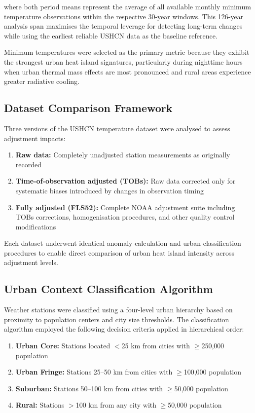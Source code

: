 \documentclass[11pt, a4paper]{article}
\begin{document}
where both period means represent the average of all available monthly minimum temperature observations within the respective 30-year windows. This 126-year analysis span maximises the temporal leverage for detecting long-term changes while using the earliest reliable USHCN data as the baseline reference.

Minimum temperatures were selected as the primary metric because they exhibit the strongest urban heat island signatures, particularly during nighttime hours when urban thermal mass effects are most pronounced and rural areas experience greater radiative cooling.

\subsection{Dataset Comparison Framework}

Three versions of the USHCN temperature dataset were analysed to assess adjustment impacts:

\begin{enumerate} \item \textbf{Raw data:} Completely unadjusted station measurements as originally recorded \item \textbf{Time-of-observation adjusted (TOBs):} Raw data corrected only for systematic biases introduced by changes in observation timing \item \textbf{Fully adjusted (FLS52):} Complete NOAA adjustment suite including TOBs corrections, homogenisation procedures, and other quality control modifications \end{enumerate}

Each dataset underwent identical anomaly calculation and urban classification procedures to enable direct comparison of urban heat island intensity across adjustment levels.

\subsection{Urban Context Classification Algorithm}

Weather stations were classified using a four-level urban hierarchy based on proximity to population centers and city size thresholds. The classification algorithm employed the following decision criteria applied in hierarchical order:

\begin{enumerate} \item \textbf{Urban Core:} Stations located $<$25 km from cities with $\geq$250,000 population \item \textbf{Urban Fringe:} Stations 25--50 km from cities with $\geq$100,000 population \item \textbf{Suburban:} Stations 50--100 km from cities with $\geq$50,000 population \item \textbf{Rural:} Stations $>$100 km from any city with $\geq$50,000 population \end{enumerate}
\end{document}
